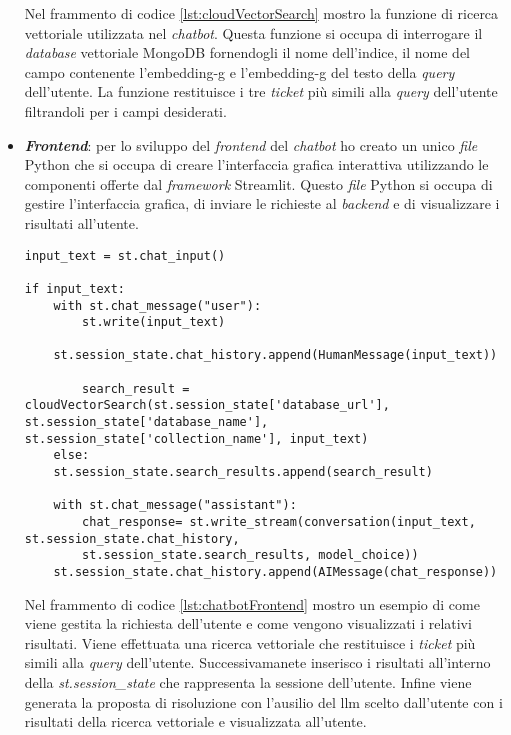 \begin{itemize}
    Nel frammento di codice \ref{lst:cloudVectorSearch} mostro la funzione di ricerca vettoriale utilizzata nel \textit{chatbot}. Questa funzione si occupa di interrogare il \textit{database} vettoriale MongoDB fornendogli il nome dell'indice, il nome del campo contenente l'\gls{embedding-g} e l'\gls{embedding-g} del testo della \textit{query} dell'utente. La funzione restituisce i tre \textit{ticket} più simili alla \textit{query} dell'utente filtrandoli per i campi desiderati.
    \item \textbf{\textit{Frontend}}: per lo sviluppo del \textit{frontend} del \textit{chatbot} ho creato un unico \textit{file} Python che si occupa di creare l'interfaccia grafica interattiva utilizzando le componenti offerte dal \textit{framework} Streamlit. Questo \textit{file} Python si occupa di gestire l'interfaccia grafica, di inviare le richieste al \textit{backend} e di visualizzare i risultati all'utente.
    \begin{verbatim}
input_text = st.chat_input()

if input_text:
    with st.chat_message("user"):
        st.write(input_text)

    st.session_state.chat_history.append(HumanMessage(input_text))

        search_result = cloudVectorSearch(st.session_state['database_url'], st.session_state['database_name'], st.session_state['collection_name'], input_text)
    else:
    st.session_state.search_results.append(search_result)

    with st.chat_message("assistant"):
        chat_response= st.write_stream(conversation(input_text, st.session_state.chat_history,
        st.session_state.search_results, model_choice))
    st.session_state.chat_history.append(AIMessage(chat_response))
    \end{verbatim}
    \label{lst:chatbotFrontend} 

    Nel frammento di codice \ref{lst:chatbotFrontend} mostro un esempio di come viene gestita la richiesta dell'utente e come vengono visualizzati i relativi risultati. Viene effettuata una ricerca vettoriale che restituisce i \textit{ticket} più simili alla \textit{query} dell'utente. 
    Successivamanete inserisco i risultati all'interno della \textit{st.session\_state} che rappresenta la sessione dell'utente. Infine viene generata la proposta di risoluzione con l'ausilio del \gls{llm} scelto dall'utente con i risultati della ricerca vettoriale e visualizzata all'utente.
\end{itemize}

